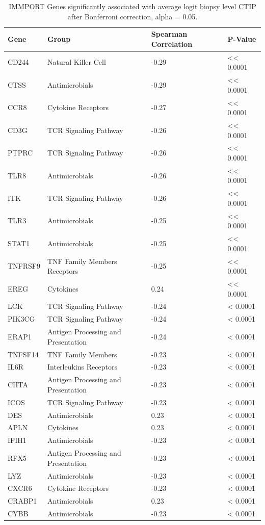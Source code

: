 \documentclass[
]{book}
\begin{document}
\begin{table}

\caption{\label{tab:unnamed-chunk-3}IMMPORT Genes significantly associated with average logit biopsy level CTIP after Bonferroni correction, alpha = 0.05.}
\centering
\begin{tabular}[t]{l|l|l|l}
\hline
Gene & Group & Spearman Correlation & P-Value\\
\hline
CD244 & Natural Killer Cell & -0.29 & << 0.0001\\
\hline
CTSS & Antimicrobials & -0.29 & << 0.0001\\
\hline
CCR8 & Cytokine Receptors & -0.27 & << 0.0001\\
\hline
CD3G & TCR Signaling Pathway & -0.26 & << 0.0001\\
\hline
PTPRC & TCR Signaling Pathway & -0.26 & << 0.0001\\
\hline
TLR8 & Antimicrobials & -0.26 & << 0.0001\\
\hline
ITK & TCR Signaling Pathway & -0.26 & << 0.0001\\
\hline
TLR3 & Antimicrobials & -0.25 & << 0.0001\\
\hline
STAT1 & Antimicrobials & -0.25 & << 0.0001\\
\hline
TNFRSF9 & TNF Family Members Receptors & -0.25 & << 0.0001\\
\hline
EREG & Cytokines & 0.24 & << 0.0001\\
\hline
LCK & TCR Signaling Pathway & -0.24 & < 0.0001\\
\hline
PIK3CG & TCR Signaling Pathway & -0.24 & < 0.0001\\
\hline
ERAP1 & Antigen Processing and Presentation & -0.24 & < 0.0001\\
\hline
TNFSF14 & TNF Family Members & -0.23 & < 0.0001\\
\hline
IL6R & Interleukins Receptors & -0.23 & < 0.0001\\
\hline
CIITA & Antigen Processing and Presentation & -0.23 & < 0.0001\\
\hline
ICOS & TCR Signaling Pathway & -0.23 & < 0.0001\\
\hline
DES & Antimicrobials & 0.23 & < 0.0001\\
\hline
APLN & Cytokines & 0.23 & < 0.0001\\
\hline
IFIH1 & Antimicrobials & -0.23 & < 0.0001\\
\hline
RFX5 & Antigen Processing and Presentation & -0.23 & < 0.0001\\
\hline
LYZ & Antimicrobials & -0.23 & < 0.0001\\
\hline
CXCR6 & Cytokine Receptors & -0.23 & < 0.0001\\
\hline
CRABP1 & Antimicrobials & 0.23 & < 0.0001\\
\hline
CYBB & Antimicrobials & -0.23 & < 0.0001\\
\hline
\end{tabular}
\end{table}
\end{document}

